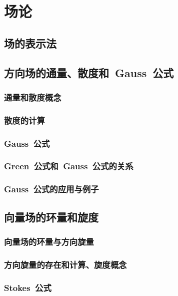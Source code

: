 

\chapter{场\emspace 论}\label{ch:23}
\section{场的表示法}
\section{方向场的通量、散度和~Gauss~公式}
\subsection{通量和散度概念}
\subsection{散度的计算}
\subsection{Gauss~公式}
\subsection{Green~公式和~Gauss~公式的关系}
\subsection{Gauss~公式的应用与例子}
\begin{exercise}

\end{exercise}
\section{向量场的环量和旋度}
\subsection{向量场的环量与方向旋量}
\subsection{方向旋量的存在和计算、旋度概念}
\subsection{Stokes~公式}
\begin{exercise}

\end{exercise}
